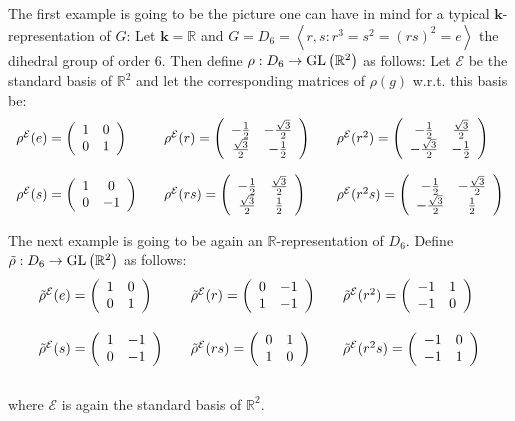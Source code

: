\begin{examples}
\begin{i_enum}
\item The first example is going to be the picture one can have in mind for a typical $\mathbf{k}$-representation of $G$: Let $\mathbf{k}=\mathbb{R}$ and $G=D_{6}=\left<r,s:r^3=s^2=(rs)^2=e\right>$ the dihedral group of order $6$. Then define $\rho:D_6\to\GL{\mathbb{R}^2}$ as follows: Let $\mathcal{E}$ be the standard basis of $\mathbb{R}^2$ and let the corresponding matrices of $\rho(g)$ w.r.t. this basis be:
$$\begin{array}{lclcl}
\rho^{\mathcal{E}}(e)=\twocols{1}{0}{0}{1}&&\rho^{\mathcal{E}}(r)=\twocols{-\frac{1}{2}}{\frac{\sqrt{3}}{2}}{-\frac{\sqrt{3}}{2}}{-\frac{1}{2}}&&\rho^{\mathcal{E}}(r^2)=\twocols{-\frac{1}{2}}{-\frac{\sqrt{3}}{2}}{\frac{\sqrt{3}}{2}}{-\frac{1}{2}}\\[2em]
\rho^{\mathcal{E}}(s)=\twocols{1}{0}{0}{-1}&&\rho^{\mathcal{E}}(rs)=\twocols{-\frac{1}{2}}{\frac{\sqrt{3}}{2}}{\frac{\sqrt{3}}{2}}{\frac{1}{2}}&&\rho^{\mathcal{E}}(r^2s)=\twocols{-\frac{1}{2}}{-\frac{\sqrt{3}}{2}}{-\frac{\sqrt{3}}{2}}{\frac{1}{2}}\\
\end{array}$$
\item The next example is going to be again an $\mathbb{R}$-representation of $D_6$. Define $\tilde{\rho}:D_6\to\GL{\mathbb{R}^2}$ as follows:
$$\begin{array}{lclcl}
\tilde{\rho}^{\mathcal{E}}(e)=\twocols{1}{0}{0}{1}&&\tilde{\rho}^{\mathcal{E}}(r)=\twocols{0}{1}{-1}{-1}&&\tilde{\rho}^{\mathcal{E}}(r^2)=\twocols{-1}{-1}{1}{0}\\[2em]
\tilde{\rho}^{\mathcal{E}}(s)=\twocols{1}{0}{-1}{-1}&&\tilde{\rho}^{\mathcal{E}}(rs)=\twocols{0}{1}{1}{0}&&\tilde{\rho}^{\mathcal{E}}(r^2s)=\twocols{-1}{-1}{0}{1}\\[2em]
\end{array}$$
where $\mathcal{E}$ is again the standard basis of $\mathbb{R}^2$.


\end{i_enum}
\end{examples}
